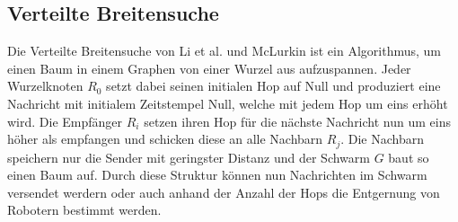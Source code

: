 \subsection{Verteilte Breitensuche}

Die Verteilte Breitensuche von Li et al. und McLurkin ist ein Algorithmus, um einen Baum in einem 
Graphen von einer Wurzel aus aufzuspannen. Jeder Wurzelknoten $R_0$ setzt dabei seinen initialen Hop 
auf Null und produziert eine Nachricht mit initialem Zeitstempel Null, welche mit jedem Hop um eins 
erhöht wird. Die Empfänger $R_i$ setzen ihren Hop für die nächste Nachricht nun um eins höher als empfangen 
und schicken diese an alle Nachbarn $R_j$. Die Nachbarn speichern nur die Sender mit geringster Distanz und 
der Schwarm $G$ baut so einen Baum auf. Durch diese Struktur können nun Nachrichten im Schwarm versendet
werdern oder auch anhand der Anzahl der Hops die Entgernung von Robotern bestimmt werden.